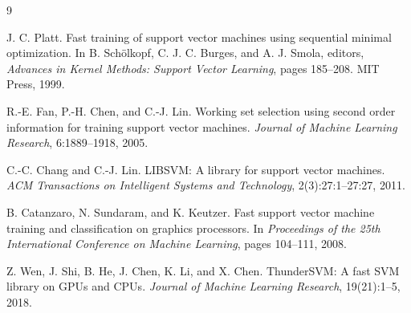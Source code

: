 \begin{thebibliography}{9}

J. C. Platt.
\newblock Fast training of support vector machines using sequential minimal
optimization.
\newblock In B. Sch\"olkopf, C. J. C. Burges, and A. J. Smola, editors,
\emph{Advances in Kernel Methods: Support Vector Learning}, pages 185--208.
MIT Press, 1999.

R.-E. Fan, P.-H. Chen, and C.-J. Lin.
\newblock Working set selection using second order information for training
support vector machines.
\newblock \emph{Journal of Machine Learning Research}, 6:1889--1918, 2005.

C.-C. Chang and C.-J. Lin.
\newblock LIBSVM: A library for support vector machines.
\newblock \emph{ACM Transactions on Intelligent Systems and Technology},
2(3):27:1--27:27, 2011.

B. Catanzaro, N. Sundaram, and K. Keutzer.
\newblock Fast support vector machine training and classification on graphics
processors.
\newblock In \emph{Proceedings of the 25th International Conference on Machine
Learning}, pages 104--111, 2008.

Z. Wen, J. Shi, B. He, J. Chen, K. Li, and X. Chen.
\newblock ThunderSVM: A fast SVM library on GPUs and CPUs.
\newblock \emph{Journal of Machine Learning Research}, 19(21):1--5, 2018.

\end{thebibliography}
